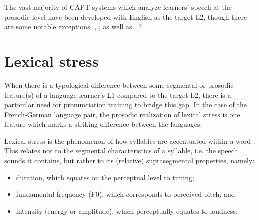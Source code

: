 	The vast majority of CAPT systems which analyze learners' speech at the prosodic level have been developed with English as the target L2, though there are some notable exceptions.
	, , as well as . ?
	
	
	
 \section{Lexical stress}
 \label{sec:bkgd:stress}
		When there is a typological difference between some segmental or prosodic feature(s) of a language learner's L1 compared to the target L2, there is a particular need for pronunciation training to bridge this gap. In the case of the French-German language pair, the prosodic realization of lexical stress is one feature which marks a striking difference between the languages.
		
			Lexical stress is the phenomenon of how syllables are accentuated within a word  \citep{Cutler2005}. This relates not to the segmental characteristics of a syllable, i.e. the speech sounds it contains, but rather to its (relative) suprasegmental properties, namely: %
			\begin{itemize}
			\item duration, which equates on the perceptual level to timing;
			\item fundamental frequency (F0), which corresponds to perceived pitch; and
			\item intensity (energy or amplitude), which perceptually equates to loudness.
			\end{itemize}

		
		
